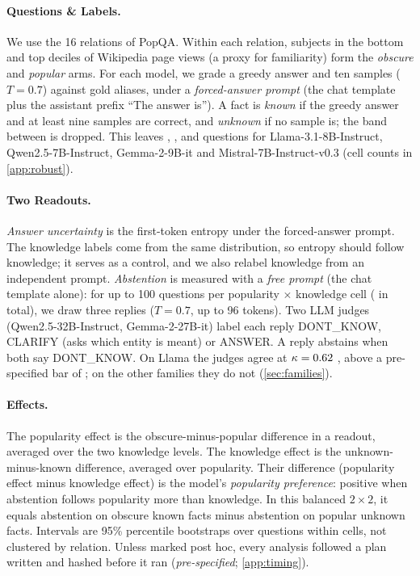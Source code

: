 \documentclass{article}
\begin{document}
\paragraph{Questions \& Labels.} We use the 16 relations of PopQA. Within each relation, subjects in the bottom and top deciles of Wikipedia page views (a proxy for familiarity) form the \emph{obscure} and \emph{popular} arms. For each model, we grade a greedy answer and ten samples ($T=0.7$) against gold aliases, under a \emph{forced-answer prompt} (the chat template plus the assistant prefix ``The answer is''). A fact is \emph{known} if the greedy answer and at least nine samples are correct, and \emph{unknown} if no sample is; the band between is dropped. This leaves \faLlamaN, \faQwenN, \faGemmaN{} and \faMistralN{} questions for Llama-3.1-8B-Instruct, Qwen2.5-7B-Instruct, Gemma-2-9B-it and Mistral-7B-Instruct-v0.3 \citep{llama3,qwen25,gemma2,mistral7b} (cell counts in \cref{app:robust}).

\paragraph{Two Readouts.} \emph{Answer uncertainty} is the first-token entropy under the forced-answer prompt. The knowledge labels come from the same distribution, so entropy should follow knowledge; it serves as a control, and we also relabel knowledge from an independent prompt. \emph{Abstention} is measured with a \emph{free prompt} (the chat template alone): for up to 100 questions per popularity $\times$ knowledge cell (\hmLlamaItems{} in total), we draw three replies ($T=0.7$, up to 96 tokens). Two LLM judges (Qwen2.5-32B-Instruct, Gemma-2-27B-it) label each reply DONT\_KNOW, CLARIFY (asks which entity is meant) or ANSWER. A reply abstains when both say DONT\_KNOW. On Llama the judges agree at $\kappa=0.62$ \lkKappaCI, above a pre-specified bar of \kappaBar; on the other families they do not (\cref{sec:families}).

\paragraph{Effects.} The popularity effect is the obscure-minus-popular difference in a readout, averaged over the two knowledge levels. The knowledge effect is the unknown-minus-known difference, averaged over popularity. Their difference (popularity effect minus knowledge effect) is the model's \emph{popularity preference}: positive when abstention follows popularity more than knowledge. In this balanced $2\times2$, it equals abstention on obscure known facts minus abstention on popular unknown facts. Intervals are 95\% percentile bootstraps over questions within cells, not clustered by relation. Unless marked post hoc, every analysis followed a plan written and hashed before it ran (\emph{pre-specified}; \cref{app:timing}).
\end{document}
